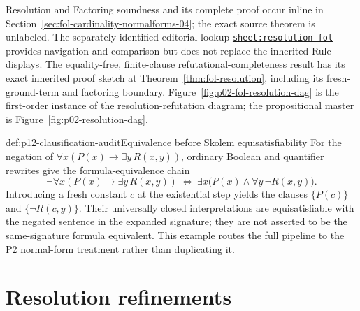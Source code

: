 Resolution and Factoring soundness and its complete proof occur inline in
Section~\ref{sec:fol-cardinality-normalforms-04}; the exact source theorem is
unlabeled.  The separately identified editorial lookup
\hyperref[sheet:resolution-fol]{\texttt{sheet:resolution-fol}} provides
navigation and comparison but does not replace the inherited Rule displays.
The equality-free, finite-clause refutational-completeness result has its exact
inherited proof sketch at Theorem~\ref{thm:fol-resolution}, including
its fresh-ground-term and factoring boundary.  Figure~\ref{fig:p02-fol-resolution-dag}
is the first-order instance of the resolution-refutation diagram; the propositional master is
Figure~\ref{fig:p02-resolution-dag}.

\begin{hbexample}{def:p12-clausification-audit}{Equivalence before Skolem equisatisfiability}
For the negation of
\(\forall x(P(x)\to\exists y\,R(x,y))\), ordinary Boolean and quantifier
rewrites give the formula-equivalence chain
\[
 \neg\forall x(P(x)\to\exists y\,R(x,y))
 \ \Leftrightarrow\
 \exists x\bigl(P(x)\land\forall y\,\neg R(x,y)\bigr).
\]
Introducing a fresh constant \(c\) at the existential step yields the clauses
\(\{P(c)\}\) and \(\{\neg R(c,y)\}\).  Their universally closed
interpretations are equisatisfiable with the negated sentence in the expanded
signature; they are not asserted to be the same-signature formula equivalent.
This example routes the full pipeline to the P2 normal-form treatment rather
than duplicating it.
\end{hbexample}

\section{Resolution refinements}

